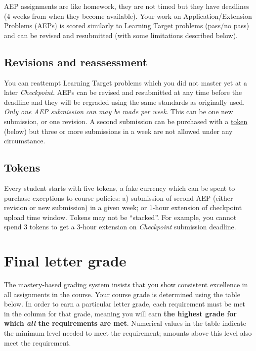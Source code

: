 AEP assignments are like homework, they are not timed but they have
deadlines (4 weeks from when they become available). Your work on
Application/Extension Problems (AEPs) is scored similarly to Learning
Target problems (pass/no pass) and can be revised and resubmitted (with
some limitations described below).

\hypertarget{revisions}{%
\subsection{Revisions and reassessment}\label{revisions}}

You can reattempt Learning Target problems which you did not master yet
at a later \emph{Checkpoint}. AEPs can be revised and resubmitted at any
time before the deadline and they will be regraded using the same
standards as originally used. \emph{Only one AEP submission can may be
made per week}. This can be one new submission, or one revision. A
second submission can be purchased with a
\protect\hyperlink{tokens}{token} (below) but three or more submissions
in a week are not allowed under any circumstance.

\hypertarget{tokens}{%
\subsection{Tokens}\label{tokens}}

Every student starts with five tokens, a fake currency which can be
spent to purchase exceptions to course policies: a) submission of second
AEP (either revision or new submission) in a given week; or 1-hour
extension of checkpoint upload time window. Tokens may not be
``stacked''. For example, you cannot spend 3 tokens to get a 3-hour
extension on \emph{Checkpoint} submission deadline.

\hypertarget{final-letter-grade}{%
\section{Final letter grade}\label{final-letter-grade}}

The mastery-based grading system insists that you show consistent
excellence in all assignments in the course. Your course grade is
determined using the table below. In order to earn a particular letter
grade, each requirement must be met in the column for that grade,
meaning you will earn \textbf{the highest grade for which \emph{all} the
requirements are met}. Numerical values in the table indicate the
minimum level needed to meet the requirement; amounts above this level
also meet the requirement.

